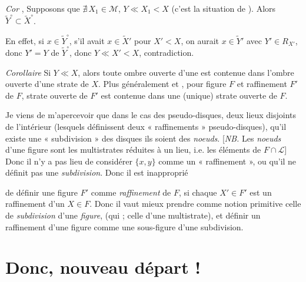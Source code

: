 \documentclass[11pt,a4paper]{article}
\begin{document}
\emph{Cor} \quad \struck{\ill{}}, Supposons que $\nexists\, X_1 \in \mathcal{M}$, \quad $Y \ll X_1 < X$ (c'est la situation de \ill{}). Alors $\widetilde{Y}^{\circ} \subset \widetilde{X}^{\circ}$.

En effet, si $x \in \widetilde{Y}^{\circ}$, s'il avait $x \in \widetilde{X}'$ pour $X' < X$, on aurait $x \in \widetilde{Y}'$ avec $Y' \in R_{X'}$, donc $Y' = Y$   de $\widetilde{Y}^{\circ}$, donc $Y \ll X' < X$, contradiction.

\emph{Corollaire} \quad Si \struck{\ill{}} $Y \ll X$, alors  toute ombre ouverte d'une \struck{\ill{}}  est contenue dans l'ombre ouverte d'une strate de $X$. Plus généralement et , pour \struck{\ill{}} figure $F$ et \add{\ill{}} raffinement $F'$ de $F$, \struck{\ill{}}  strate ouverte de $F'$ est contenue dans une (unique) strate ouverte de $F$.


Je viens de m'apercevoir que dans le cas des pseudo-disques, \struck{\ill{}} deux lieux disjoints  de l'intérieur (lesquels définissent deux  « raffinements »  pseudo-disques), qu'il existe une « subdivision » des disques \ill{} ils soient des  \emph{noeuds}. [\emph{NB.} Les \emph{noeuds} d'une figure  sont les multistrates  réduites à un lieu, i.e. les éléments de $F \cap \mathcal{L}$] Donc \struck{\ill{}} il n'y a pas lieu de considérer $\{x, y\}$ comme un \ill{} « raffinement », ou qu'il ne définit pas une \emph{subdivision}. Donc il est inapproprié

de définir une figure $F'$ comme \emph{raffinement} de $F$, si chaque $X' \in F'$ est un raffinement d'un $X \in F$. Donc il vaut mieux prendre comme notion primitive celle de \emph{subdivision} d'une \emph{figure}, (qui \ill{} ; celle d'une multistrate), et définir un raffinement d'une figure comme une sous-figure d'une subdivision.

\section{Donc, nouveau départ !}
\end{document}
